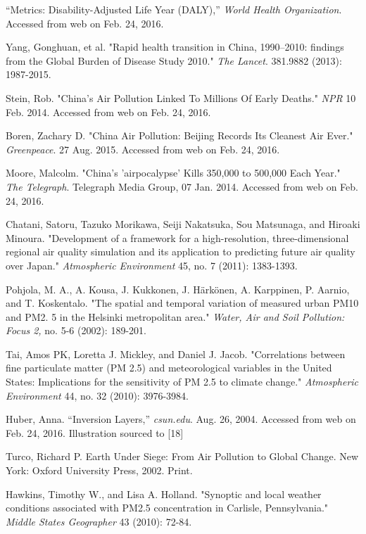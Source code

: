 \documentclass[11pt]{article} %
\begin{document}
\begin{thebibliography}{1}
 ``Metrics: Disability-Adjusted Life Year (DALY),'' \textit{World Health Organization}. Accessed from web on Feb. 24, 2016.

Yang, Gonghuan, et al. "Rapid health transition in China, 1990–2010: findings from the Global Burden of Disease Study 2010." \textit{The Lancet}. 381.9882 (2013): 1987-2015.

Stein, Rob. "China's Air Pollution Linked To Millions Of Early Deaths." \textit{NPR} 10 Feb. 2014. Accessed from web on Feb. 24, 2016.

Boren, Zachary D. "China Air Pollution: Beijing Records Its Cleanest Air Ever." \textit{Greenpeace}. 27 Aug. 2015. Accessed from web on Feb. 24, 2016.

Moore, Malcolm. "China's 'airpocalypse' Kills 350,000 to 500,000 Each Year." \textit{The Telegraph}. Telegraph Media Group, 07 Jan. 2014. Accessed from web on Feb. 24, 2016.

Chatani, Satoru, Tazuko Morikawa, Seiji Nakatsuka, Sou Matsunaga, and Hiroaki Minoura. "Development of a framework for a high-resolution, three-dimensional regional air quality simulation and its application to predicting future air quality over Japan." \textit{Atmospheric Environment} 45, no. 7 (2011): 1383-1393.

Pohjola, M. A., A. Kousa, J. Kukkonen, J. Härkönen, A. Karppinen, P. Aarnio, and T. Koskentalo. "The spatial and temporal variation of measured urban PM10 and PM2. 5 in the Helsinki metropolitan area." \textit{Water, Air and Soil Pollution: Focus 2,} no. 5-6 (2002): 189-201.

Tai, Amos PK, Loretta J. Mickley, and Daniel J. Jacob. "Correlations between fine particulate matter (PM 2.5) and meteorological variables in the United States: Implications for the sensitivity of PM 2.5 to climate change." \textit{Atmospheric Environment} 44, no. 32 (2010): 3976-3984.

 Huber, Anna. ``Inversion Layers,'' \textit{csun.edu}. Aug. 26, 2004. Accessed from web on Feb. 24, 2016. 
Illustration sourced to [18]

Turco, Richard P. Earth Under Siege: From Air Pollution to Global Change. New York: Oxford University Press, 2002. Print.

Hawkins, Timothy W., and Lisa A. Holland. "Synoptic and local weather conditions associated with PM2.5 concentration in Carlisle, Pennsylvania." \textit{Middle States Geographer} 43 (2010): 72-84.



\end{thebibliography}
\end{document}
